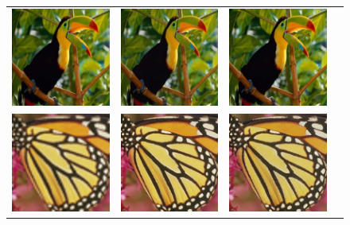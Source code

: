 \documentclass[10pt,twocolumn,letterpaper]{article}
\begin{document}
\begin{figure}[h!]
\begin{tabular}{cccc}
     	\includegraphics[width=1.4in]{images/used/appendix/jpg/Set5/bird_SRResNet-MSE} &
     	\includegraphics[width=1.4in]{images/used/appendix/jpg/Set5/bird_SRGAN-VGG54} &
     	\includegraphics[width=1.4in]{images/used/appendix/jpg/Set5/bird_HR} \\
     	\includegraphics[width=1.4in]{images/used/appendix/jpg/Set5/butterfly_bicubic}&
     	\includegraphics[width=1.4in]{images/used/appendix/jpg/Set5/butterfly_SRResNet-MSE} &
     	\includegraphics[width=1.4in]{images/used/appendix/jpg/Set5/butterfly_SRGAN-VGG54} &

\end{tabular}
\end{figure}
\end{document}

